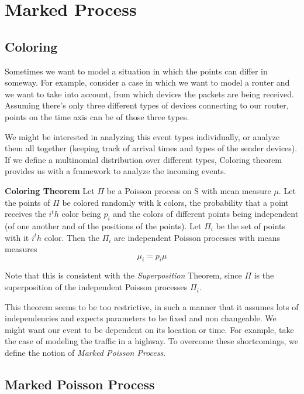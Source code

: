 \documentclass{article}
\begin{document}
\section{Marked Process}

\subsection{Coloring}

    Sometimes we want to model a situation in which the points can differ in someway. For example, consider a case in which we want to model a router and we want to take into account, from which devices the packets are being received. Assuming there's only three different types of devices connecting to our router, points on the time axis can be of those three types.
    
    We might be interested in analyzing this event types individually, or analyze them all together (keeping track of arrival times and types of the sender devices). If we define a multinomial distribution over different types, Coloring theorem provides us with a framework to analyze the incoming events.
    
    \textbf{Coloring Theorem}
        Let $\Pi$ be a Poisson process on S with mean measure $\mu$. Let the points of $\Pi$ be colored randomly with k colors, the probability that a point receives the $i^th$ color being $p_i$ and the colors of different points being independent (of one another and of the positions of the points). Let $\Pi_i$ be the set of points with it $i^th$ color. Then the $\Pi_i$ are independent Poisson processes with means measures
            $$ \mu_i = p_i \mu$$
    
    Note that this is consistent with the \textit{Superposition} Theorem, since $\Pi$ is the superposition of the independent Poisson processes $\Pi_i$.
    
    This theorem seems to be too restrictive, in such a manner that it assumes lots of independencies and expects parameters to be fixed and non changeable. We might want our event to be dependent on its location or time. For example, take the case of modeling the traffic in a highway. To overcome these shortcomings, we define the notion of \textit{Marked Poisson Process}.
    
\subsection{Marked Poisson Process}
\end{document}
